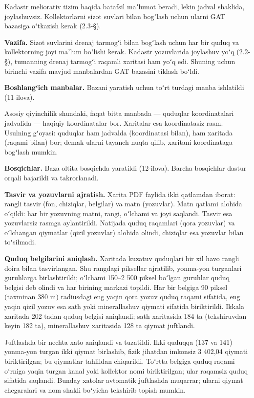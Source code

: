 Kadastr meliorativ tizim haqida batafsil maʼlumot beradi, lekin jadval
shaklida, joylashuvsiz. Kollektorlarni sizot suvlari bilan bogʻlash
uchun ularni GAT bazasiga oʻtkazish kerak (2.3-§).


\textbf{Vazifa.} Sizot suvlarini drenaj tarmogʻi bilan bogʻlash uchun
har bir quduq va kollektorning joyi maʼlum boʻlishi kerak. Kadastr
yozuvlarida joylashuv yoʻq (2.2-§), tumanning drenaj tarmogʻi raqamli
xaritasi ham yoʻq edi. Shuning uchun birinchi vazifa mavjud manbalardan
GAT bazasini tiklash boʻldi.

\textbf{Boshlangʻich manbalar.} Bazani yaratish uchun toʻrt turdagi
manba ishlatildi (11-ilova).

Asosiy qiyinchilik shundaki, faqat bitta manbada --- quduqlar
koordinatalari jadvalida --- haqiqiy koordinatalar bor. Xaritalar esa
koordinatasiz rasm. Usulning gʻoyasi: quduqlar ham jadvalda
(koordinatasi bilan), ham xaritada (raqami bilan) bor; demak ularni
tayanch nuqta qilib, xaritani koordinataga bogʻlash mumkin.

\textbf{Bosqichlar.} Baza oltita bosqichda yaratildi (12-ilova). Barcha
bosqichlar dastur orqali bajarildi va takrorlanadi.

\textbf{Tasvir va yozuvlarni ajratish.} Xarita PDF faylida ikki
qatlamdan iborat: rangli tasvir (fon, chiziqlar, belgilar) va matn
(yozuvlar). Matn qatlami alohida oʻqildi: har bir yozuvning matni,
rangi, oʻlchami va joyi saqlandi. Tasvir esa yozuvlarsiz rasmga
aylantirildi. Natijada quduq raqamlari (qora yozuvlar) va oʻlchangan
qiymatlar (qizil yozuvlar) alohida olindi, chiziqlar esa yozuvlar bilan
toʻsilmadi.

\textbf{Quduq belgilarini aniqlash.} Xaritada kuzatuv quduqlari bir xil
havo rangli doira bilan tasvirlangan. Shu rangdagi piksellar ajratilib,
yonma-yon turganlari guruhlarga birlashtirildi; oʻlchami 150--2 500
piksel boʻlgan guruhlar quduq belgisi deb olindi va har birining markazi
topildi. Har bir belgiga 90 piksel (taxminan 380 m) radiusdagi eng yaqin
qora yozuv quduq raqami sifatida, eng yaqin qizil yozuv esa sath yoki
minerallashuv qiymati sifatida biriktirildi. Ikkala xaritada 202 tadan
quduq belgisi aniqlandi; sath xaritasida 184 ta (tekshiruvdan keyin 182
ta), minerallashuv xaritasida 128 ta qiymat juftlandi.

Juftlashda bir nechta xato aniqlandi va tuzatildi. Ikki quduqqa (137 va
141) yonma-yon turgan ikki qiymat birlashib, fizik jihatdan imkonsiz 3
402,04 qiymati biriktirilgan; bu qiymatlar tahlildan chiqarildi. Toʻrtta
belgiga quduq raqami oʻrniga yaqin turgan kanal yoki kollektor nomi
biriktirilgan; ular raqamsiz quduq sifatida saqlandi. Bunday xatolar
avtomatik juftlashda muqarrar; ularni qiymat chegaralari va nom shakli
boʻyicha tekshirib topish mumkin.

